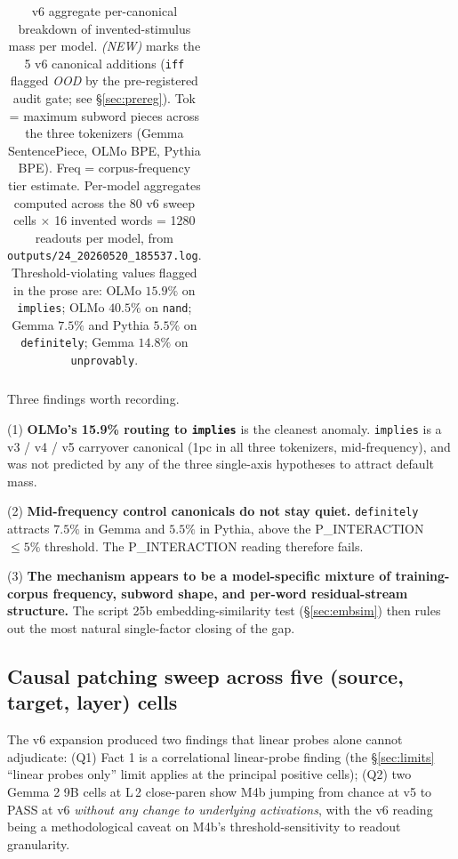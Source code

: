 \documentclass[11pt,letterpaper]{article}
\newcommand{\Mbfb}{M4b}
\begin{document}
\begin{table}[h]
{\begin{tabular}{llllrrr}
    \bottomrule
  \end{tabular}}
  \caption{v6 aggregate per-canonical breakdown of invented-stimulus
  mass per model. \emph{(NEW)} marks the 5 v6 canonical additions
  (\texttt{iff} flagged \emph{OOD} by the pre-registered audit gate;
  see \S\ref{sec:prereg}). Tok = maximum subword pieces across the
  three tokenizers (Gemma SentencePiece, OLMo BPE, Pythia BPE).
  Freq = corpus-frequency tier estimate. Per-model aggregates
  computed across the 80 v6 sweep cells $\times$ 16 invented words
  = 1280 readouts per model, from
  \texttt{outputs/24\_20260520\_185537.log}. Threshold-violating
  values flagged in the prose are: OLMo $15.9\%$ on \texttt{implies};
  OLMo $40.5\%$ on \texttt{nand}; Gemma $7.5\%$ and Pythia $5.5\%$ on
  \texttt{definitely}; Gemma $14.8\%$ on \texttt{unprovably}.}
  \label{tab:default}
\end{table}

Three findings worth recording.

(1) \textbf{OLMo's 15.9\% routing to \texttt{implies}} is the
cleanest anomaly. \texttt{implies} is a v3 / v4 / v5 carryover
canonical (1pc in all three tokenizers, mid-frequency), and was not
predicted by any of the three single-axis hypotheses to attract
default mass.

(2) \textbf{Mid-frequency control canonicals do not stay quiet.}
\texttt{definitely} attracts $7.5\%$ in Gemma and $5.5\%$ in Pythia,
above the P\_INTERACTION $\leq 5\%$ threshold. The P\_INTERACTION
reading therefore fails.

(3) \textbf{The mechanism appears to be a model-specific mixture of
training-corpus frequency, subword shape, and per-word
residual-stream structure.} The script 25b embedding-similarity test
(\S\ref{sec:embsim}) then rules out the most natural single-factor
closing of the gap.

\subsection{Causal patching sweep across five (source, target, layer) cells}
\label{sec:causal}

The v6 expansion produced two findings that linear probes alone
cannot adjudicate: (Q1) Fact 1 is a correlational linear-probe
finding (the \S\ref{sec:limits} ``linear probes only'' limit applies
at the principal positive cells); (Q2) two Gemma 2 9B cells at L\,2
close-paren show \Mbfb{} jumping from chance at v5 to PASS at v6
\emph{without any change to underlying activations}, with the v6
reading being a methodological caveat on \Mbfb{}'s
threshold-sensitivity to readout granularity.
\end{document}
